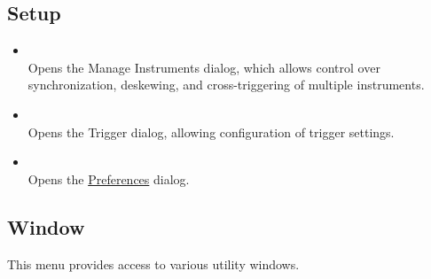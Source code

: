 \subsection{Setup}

\begin{itemize}

\item {}\\
Opens the Manage Instruments dialog, which allows control over synchronization, deskewing, and cross-triggering of
multiple instruments.

\item {}\\
Opens the Trigger dialog, allowing configuration of trigger settings.

\item {}\\
Opens the \hyperref[dlg:preferences]{Preferences} dialog.

\end{itemize}

\subsection{Window}

This menu provides access to various utility windows.

